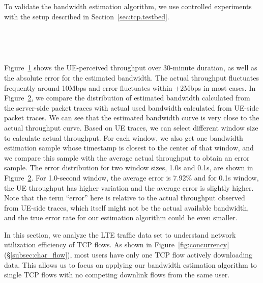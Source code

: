 
To validate the bandwidth estimation algorithm, we use controlled experiments with the setup described in Section~\ref{sec:tcp.testbed}.

\begin{figure}[t]
\centering
{}\\
\label{fig:bw.time}
\end{figure}

\begin{figure}[t]
\centering
{}\\
\label{fig:bw.cdf}
\end{figure}

Figure~\ref{fig:bw.time} shows the UE-perceived throughput over 30-minute duration, as well as the absolute error for the estimated bandwidth. The actual throughput fluctuates frequently around 10Mbps and error fluctuates within $\pm2$Mbps in most cases. In Figure~\ref{fig:bw.cdf}, we compare the distribution of estimated bandwidth calculated from the server-side packet traces with actual used bandwidth calculated from UE-side packet traces. We can see that the estimated bandwidth curve is very close to the actual throughput curve. Based on UE traces, we can select different window size to calculate actual throughput. For each window, we also get one bandwidth estimation sample whose timestamp is closest to the center of that window, and we compare this sample with the average actual throughput to obtain an error sample. The error distribution for two window sizes, \ie 1.0s and 0.1s, are shown in Figure~\ref{fig:bw.cdf}. For 1.0-second window, the average error is 7.92\% and for 0.1s window, the UE throughput has higher variation and the average error is slightly higher. Note that the term ``error'' here is relative to the actual throughput observed from UE-side traces, which itself might not be the actual available bandwidth, and the true error rate for our estimation algorithm could be even smaller.


In this section, we analyze the LTE traffic data set to understand network utilization efficiency of TCP flows.
As shown in Figure~\ref{fig:concurrency} (\S\ref{subsec:char_flow}), most users have only one TCP flow actively downloading data. This allows us to 
focus on applying our bandwidth estimation algorithm to single TCP flows with no competing downlink flows from the same user.

